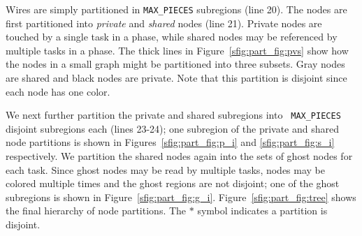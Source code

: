 Wires are simply partitioned in {\tt MAX\_PIECES} subregions (line 20).  
The nodes are first partitioned into 
{\em private} and {\em shared} nodes (line 21).  Private nodes
are touched by a single task in a phase, while shared nodes may
be referenced by multiple tasks in a phase.  The thick lines in Figure~\ref{sfig:part_fig:pvs}
show how the nodes in a small graph might be partitioned into three subsets.  Gray
nodes are shared and black nodes are private.  Note that
this partition is disjoint since each node has one color.

We next further partition the private and shared subregions into {\tt
MAX\_PIECES} disjoint subregions each (lines 23-24); one subregion of the private and shared node partitions
is shown in Figures~\ref{sfig:part_fig:p_i} and \ref{sfig:part_fig:s_i} respectively.  
We partition the shared nodes again
into the sets of ghost nodes for each task.  Since ghost nodes may be read by multiple tasks,
nodes may be colored multiple times and the ghost regions are not disjoint; one of the ghost subregions is shown in Figure~\ref{sfig:part_fig:g_i}.
Figure~\ref{sfig:part_fig:tree} shows the final hierarchy of node partitions.  The $*$ symbol indicates a partition is 
disjoint.


